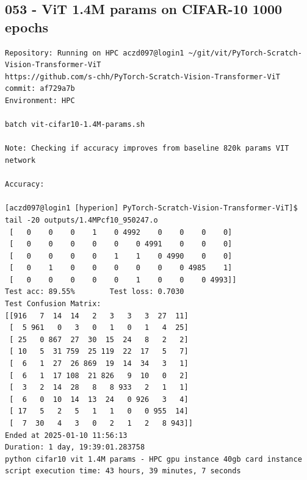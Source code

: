 \subsection{053 - ViT 1.4M params on CIFAR-10 1000 epochs}
\label{app_res:053}
\begin{verbatim}
Repository: Running on HPC aczd097@login1 ~/git/vit/PyTorch-Scratch-Vision-Transformer-ViT
https://github.com/s-chh/PyTorch-Scratch-Vision-Transformer-ViT
commit: af729a7b
Environment: HPC

batch vit-cifar10-1.4M-params.sh

Note: Checking if accuracy improves from baseline 820k params VIT network

Accuracy: 

[aczd097@login1 [hyperion] PyTorch-Scratch-Vision-Transformer-ViT]$ tail -20 outputs/1.4MPcf10_950247.o
 [   0    0    0    1    0 4992    0    0    0    0]
 [   0    0    0    0    0    0 4991    0    0    0]
 [   0    0    0    0    1    1    0 4990    0    0]
 [   0    1    0    0    0    0    0    0 4985    1]
 [   0    0    0    0    0    1    0    0    0 4993]]
Test acc: 89.55%        Test loss: 0.7030
Test Confusion Matrix:
[[916   7  14  14   2   3   3   3  27  11]
 [  5 961   0   3   0   1   0   1   4  25]
 [ 25   0 867  27  30  15  24   8   2   2]
 [ 10   5  31 759  25 119  22  17   5   7]
 [  6   1  27  26 869  19  14  34   3   1]
 [  6   1  17 108  21 826   9  10   0   2]
 [  3   2  14  28   8   8 933   2   1   1]
 [  6   0  10  14  13  24   0 926   3   4]
 [ 17   5   2   5   1   1   0   0 955  14]
 [  7  30   4   3   0   2   1   2   8 943]]
Ended at 2025-01-10 11:56:13
Duration: 1 day, 19:39:01.283758
python cifar10 vit 1.4M params - HPC gpu instance 40gb card instance script execution time: 43 hours, 39 minutes, 7 seconds

\end{verbatim}

